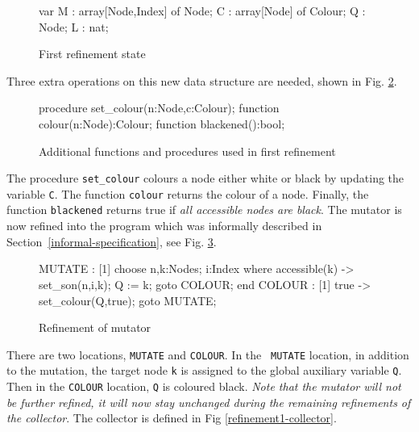 \begin{figure}[htb]
\begin{smallsession}
  var
    M : array[Node,Index] of Node;
    C : array[Node] of Colour;
    Q : Node;
    L : nat;
\end{smallsession}
\caption{First refinement state}
\label{refinement1-state}
\end{figure}

\noindent Three extra operations on this new data structure are needed,
shown in Fig. \ref{refinement1-functions}.

\begin{figure}[htb]
\begin{smallsession}
  procedure set_colour(n:Node,c:Colour);
  function  colour(n:Node):Colour;
  function  blackened():bool;
\end{smallsession}
\caption{Additional functions and procedures used in first refinement}
\label{refinement1-functions}
\end{figure}

The procedure {\tt set\_colour} colours a node either white or black by
updating the variable {\tt C}\@.  
The function {\tt colour} returns the colour of a node. Finally, the function
{\tt blackened} returns true if {\em all accessible nodes are black}\@.
The  mutator is  now  refined  into  the program  which was informally
described   in    Section~\ref{informal-specification}, see Fig. \ref{refinement1-mutator}.

\begin{figure}[htb]
\begin{smallsession}
  MUTATE :
    [1] choose n,k:Nodes; i:Index where accessible(k) -> 
          set_son(n,i,k); 
          Q := k; 
          goto COLOUR;
        end
  COLOUR :  
    [1] true -> set_colour(Q,true); goto MUTATE;
\end{smallsession}
\caption{Refinement of mutator}
\label{refinement1-mutator}
\end{figure}

There are two  locations, {\tt MUTATE} and {\tt  COLOUR}\@.  In the {\tt
  MUTATE} location,  in addition  to  the
mutation, the target node {\tt k} is assigned  to the global auxiliary
variable {\tt  Q}\@.   Then in the  {\tt COLOUR}   location,  {\tt Q} is
coloured black.    {\em Note that    the mutator will not  be  further
  refined, it will now stay unchanged during the remaining refinements
  of the collector}\@. The collector is defined in Fig \ref{refinement1-collector}.

